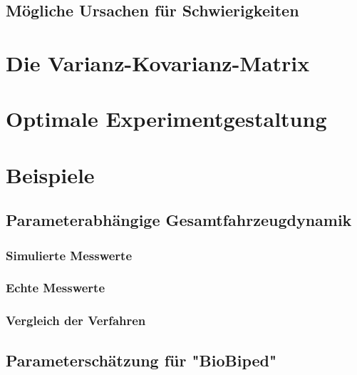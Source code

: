 		\subsection{Mögliche Ursachen für Schwierigkeiten} %

	\section{Die Varianz-Kovarianz-Matrix} %

	\section{Optimale Experimentgestaltung} %

	\section{Beispiele} %

		\subsection{Parameterabhängige Gesamtfahrzeugdynamik} %

			\subsubsection{Simulierte Messwerte} %

			\subsubsection{Echte Messwerte} %

			\subsubsection{Vergleich der Verfahren} %

		\subsection{Parameterschätzung für "BioBiped"} %
